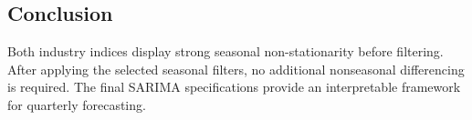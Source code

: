 \documentclass[
  11pt,
]{article}
\newenvironment{Shaded}{\begin{snugshade}}{\end{snugshade}}
\newcommand{\AttributeTok}[1]{\textcolor[rgb]{0.13,0.29,0.53}{#1}}
\newcommand{\CommentTok}[1]{\textcolor[rgb]{0.56,0.35,0.01}{\textit{#1}}}
\newcommand{\DecValTok}[1]{\textcolor[rgb]{0.00,0.00,0.81}{#1}}
\newcommand{\FunctionTok}[1]{\textcolor[rgb]{0.13,0.29,0.53}{\textbf{#1}}}
\newcommand{\NormalTok}[1]{#1}
\newcommand{\OtherTok}[1]{\textcolor[rgb]{0.56,0.35,0.01}{#1}}
\newcommand{\SpecialCharTok}[1]{\textcolor[rgb]{0.81,0.36,0.00}{\textbf{#1}}}
\newcommand{\StringTok}[1]{\textcolor[rgb]{0.31,0.60,0.02}{#1}}
\begin{document}
\begin{Shaded}
\end{Shaded}

\subsection{Conclusion}\label{conclusion}

Both industry indices display strong seasonal non-stationarity before
filtering. After applying the selected seasonal filters, no additional
nonseasonal differencing is required. The final SARIMA specifications
provide an interpretable framework for quarterly forecasting.
\end{document}
